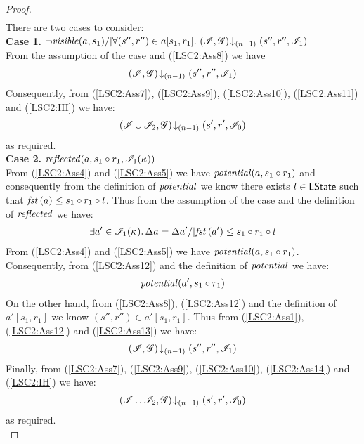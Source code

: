\begin{lemma}
\begin{proof}
\begin{align*}
\end{align*}
There are two cases to consider:\\
%
\noindent\textbf{Case 1. }
$\neg\mathit{visible}(a, s_1) /| \forall (s'', r'') \in a[s_1, r_1].\, \left(\mathscr{I}, \mathscr{G}\right) \!\downarrow_{(n-1)} \left(s'', r'', \mathscr{I}_1\right)$\\
%
From the assumption of the case and (\ref{LSC2:Ass8}) we have
%
\begin{align}
	\left(\mathscr{I}, \mathscr{G}\right) \!\downarrow_{(n-1)} \left(s'', r'', \mathscr{I}_1\right)
	\label{LSC2:Ass11}
\end{align}
%
Consequently, from (\ref{LSC2:Ass7}), (\ref{LSC2:Ass9}), (\ref{LSC2:Ass10}), (\ref{LSC2:Ass11}) and (\ref{LSC2:IH}) we have: 
%
\begin{align*}
	\left(\mathscr{I} \cup \mathscr{I}_2, \mathscr{G}\right) \!\downarrow_{(n-1)} \left(s', r', \mathscr{I}_0\right)
\end{align*}
%
as required.\\

\noindent\textbf{Case 2. }
$\mathit{reflected}(a, s_1 \circ r_1, \mathscr{I}_1(\kappa_{}))$\\
From (\ref{LSC2:Ass4}) and (\ref{LSC2:Ass5}) we have $\mathit{potential}(a, s_1 \circ r_1)$ and consequently from the definition of $\mathit{potential}$ we know there exists $l \in \textsf{LState}$ such that $\mathit{fst}\left(a\right) \leq s_1 \circ r_1 \circ l$. Thus from the assumption of the case and the definition of $\mathit{reflected}$ we have:
%
\begin{align}
	\exists a' \in \mathscr{I}_1(\kappa_{}) .\, \Delta {a} = \Delta {a'} /| \mathit{fst}\left(a'\right) \leq s_1 \circ r_1 \circ l
	\label{LSC2:Ass12}
\end{align}
%
From (\ref{LSC2:Ass4}) and (\ref{LSC2:Ass5}) we have $\mathit{potential}(a, s_1 \circ r_1)$. Consequently, from (\ref{LSC2:Ass12}) and the definition of $\mathit{potential}$ we have:
%
\begin{align}
	\mathit{potential}(a', s_1 \circ r_1)
	\label{LSC2:Ass13}
\end{align}
%
On the other hand, from (\ref{LSC2:Ass8}), (\ref{LSC2:Ass12}) and the definition of $a'[s_1, r_1]$ we know $(s'', r'') \in a'[s_1, r_1]$. Thus from (\ref{LSC2:Ass1}), (\ref{LSC2:Ass12}) and (\ref{LSC2:Ass13}) we have:
%
\begin{align}
	\left(\mathscr{I}, \mathscr{G}\right) \!\downarrow_{(n-1)} \left(s'', r'', \mathscr{I}_1\right)
	\label{LSC2:Ass14}
\end{align}
%
Finally, from (\ref{LSC2:Ass7}), (\ref{LSC2:Ass9}), (\ref{LSC2:Ass10}), (\ref{LSC2:Ass14}) and (\ref{LSC2:IH}) we have: 
%
\begin{align*}
	\left(\mathscr{I} \cup \mathscr{I}_2, \mathscr{G}\right) \!\downarrow_{(n-1)} \left(s', r', \mathscr{I}_0\right)
\end{align*}
%
as required.\\
%
%
%
%


\end{proof}
\end{lemma}
